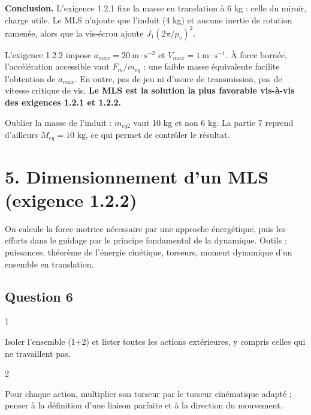 \documentclass[11pt,a4paper]{article}
\begin{document}
\textbf{Conclusion.} L'exigence 1.2.1 fixe la masse en translation à 6 kg : celle du miroir, charge utile. Le MLS n'ajoute que l'induit (4 kg) et aucune inertie de rotation ramenée, alors que la vis-écrou ajoute \(J_1(2\pi/p_v)^2\).

L'exigence 1.2.2 impose \(a_{max}=20\ \mathrm{m\cdot s^{-2}}\) et \(V_{max}=1\ \mathrm{m\cdot s^{-1}}\). À force bornée, l'accélération accessible vaut \(F_m/m_{eq}\) : une faible masse équivalente facilite l'obtention de \(a_{max}\). En outre, pas de jeu ni d'usure de transmission, pas de vitesse critique de vis. \textbf{Le MLS est la solution la plus favorable vis-à-vis des exigences 1.2.1 et 1.2.2.}

\begin{piege}

Oublier la masse de l'induit : \(m_{eq2}\) vaut 10 kg et non 6 kg. La partie 7 reprend d'ailleurs \(M_{eq}=10\) kg, ce qui permet de contrôler le résultat.

\end{piege}

\hypertarget{dimensionnement-dun-mls-exigence-1.2.2}{%
\section{5. Dimensionnement d'un MLS (exigence 1.2.2)}\label{dimensionnement-dun-mls-exigence-1.2.2}}

On calcule la force motrice nécessaire par une approche énergétique, puis les efforts dans le guidage par le principe fondamental de la dynamique. Outils : puissances, théorème de l'énergie cinétique, torseurs, moment dynamique d'un ensemble en translation.

\hypertarget{question-6}{%
\subsection{Question 6}\label{question-6}}

\begin{indication}{1}

Isoler l'ensemble (1+2) et lister toutes les actions extérieures, y compris celles qui ne travaillent pas.

\end{indication}

\begin{indication}{2}

Pour chaque action, multiplier son torseur par le torseur cinématique adapté ; penser à la définition d'une liaison parfaite et à la direction du mouvement.

\end{indication}
\end{document}
